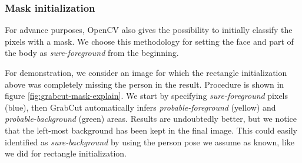 \subsubsection{Mask initialization}
\label{subsec:masking-grabcut-mask}

For advance purposes, OpenCV also gives the possibility to initially classify the pixels with a mask. We choose this methodology for setting the face and part of the body as \textit{sure-foreground} from the beginning.

For demonstration, we consider an image for which the rectangle initialization above was completely missing the person in the result. Procedure is shown in figure \ref{fig:grabcut-mask-explain}. We start by specifying \textit{sure-foreground} pixels (blue), then GrabCut automatically infers \textit{probable-foreground} (yellow) and \textit{probable-background} (green) areas. Results are undoubtedly better, but we notice that the left-most background has been kept in the final image. This could easily identified as \textit{sure-background} by using the person pose we assume as known, like we did for rectangle initialization.

